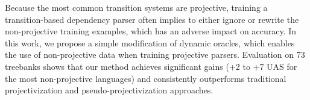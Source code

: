 Because the most common transition systems are projective, training a transition-based dependency parser often implies to either ignore or rewrite the non-projective training examples, which has an adverse impact on accuracy. In this work, we propose a simple modification of dynamic oracles, which enables the use of non-projective data when training projective parsers. Evaluation on 73 treebanks shows that our method achieves significant gains (+2 to +7 UAS for the most non-projective languages) and consistently outperforms traditional projectivization and pseudo-projectivization approaches.
